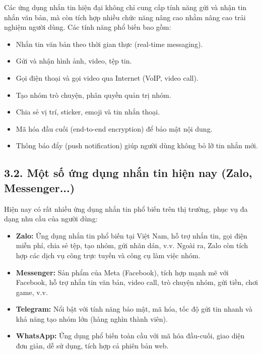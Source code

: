 \documentclass[12pt,a4paper]{article}
\begin{document}
	\noindent
	Các ứng dụng nhắn tin hiện đại không chỉ cung cấp tính năng gửi và nhận tin nhắn văn bản, mà còn tích hợp nhiều chức năng nâng cao nhằm nâng cao trải nghiệm người dùng. Các tính năng phổ biến bao gồm:
	\begin{itemize}
		\item Nhắn tin văn bản theo thời gian thực (real-time messaging).
		\item Gửi và nhận hình ảnh, video, tệp tin.
		\item Gọi điện thoại và gọi video qua Internet (VoIP, video call).
		\item Tạo nhóm trò chuyện, phân quyền quản trị nhóm.
		\item Chia sẻ vị trí, sticker, emoji và tin nhắn thoại.
		\item Mã hóa đầu cuối (end-to-end encryption) để bảo mật nội dung.
		\item Thông báo đẩy (push notification) giúp người dùng không bỏ lỡ tin nhắn mới.
	\end{itemize}
	
	\vspace{0.7cm}
	
	\subsection*{3.2. Một số ứng dụng nhắn tin hiện nay (Zalo, Messenger...)}
	\vspace{0.1cm}
	
	\noindent
	Hiện nay có rất nhiều ứng dụng nhắn tin phổ biến trên thị trường, phục vụ đa dạng nhu cầu của người dùng:
	\begin{itemize}
		\item \textbf{Zalo:} Ứng dụng nhắn tin phổ biến tại Việt Nam, hỗ trợ nhắn tin, gọi điện miễn phí, chia sẻ tệp, tạo nhóm, gửi nhãn dán, v.v. Ngoài ra, Zalo còn tích hợp các dịch vụ công trực tuyến và công cụ làm việc nhóm.
		\item \textbf{Messenger:} Sản phẩm của Meta (Facebook), tích hợp mạnh mẽ với Facebook, hỗ trợ nhắn tin văn bản, video call, trò chuyện nhóm, gửi tiền, chơi game, v.v.
		\item \textbf{Telegram:} Nổi bật với tính năng bảo mật, mã hóa, tốc độ gửi tin nhanh và khả năng tạo nhóm lớn (hàng nghìn thành viên).
		\item \textbf{WhatsApp:} Ứng dụng phổ biến toàn cầu với mã hóa đầu-cuối, giao diện đơn giản, dễ sử dụng, tích hợp cả phiên bản web.
	\end{itemize}
	
\end{document}
